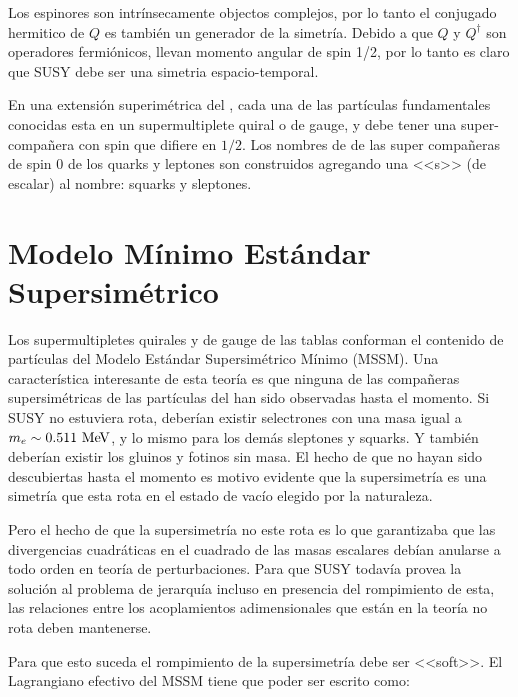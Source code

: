 Los espinores son intrínsecamente objectos complejos, por lo tanto el conjugado
hermitico de $Q$ es también un generador de la simetría. Debido a que $Q$ y $Q^\dagger$
son operadores fermiónicos, llevan momento angular de spin 1/2, por lo tanto es
claro que SUSY debe ser una simetria espacio-temporal.









En una extensión superimétrica del {\SM}, cada una de las partículas
fundamentales conocidas esta en un supermultiplete quiral o de gauge,
y debe tener una super-compa\~nera con spin que difiere en $1/2$.
Los nombres de de las super compa\~neras de spin 0 de los quarks y
leptones son construidos agregando una <<s>> (de escalar) al nombre:
squarks y sleptones.


\section{Modelo Mínimo Estándar Supersimétrico}

Los supermultipletes quirales y de gauge de las tablas conforman el contenido
de partículas del Modelo Estándar Supersimétrico Mínimo (MSSM). Una característica
interesante de esta teoría es que ninguna de las compa\~neras supersimétricas
de las partículas del {\SM} han sido observadas hasta el momento.
Si SUSY no estuviera rota, deberían existir selectrones con una masa igual
a $m_e \sim 0.511 \mev$, y lo mismo para los demás sleptones y squarks. Y también
deberían existir los gluinos y fotinos sin masa.
El hecho de que no hayan sido descubiertas hasta el momento es motivo evidente
que la supersimetría es una simetría que esta rota en el estado de vacío elegido
por la naturaleza.

Pero el hecho de que la supersimetría no este rota es lo que garantizaba
que las divergencias cuadráticas en el cuadrado de las masas escalares
debían anularse a todo orden en teoría de perturbaciones.
Para que SUSY todavía provea la solución al problema de jerarquía incluso
en presencia del rompimiento de esta, las relaciones entre los acoplamientos
adimensionales que están en la teoría no rota deben mantenerse.

Para que esto suceda el rompimiento de la supersimetría debe ser <<soft>>.
El Lagrangiano efectivo del MSSM tiene que poder ser escrito como:

